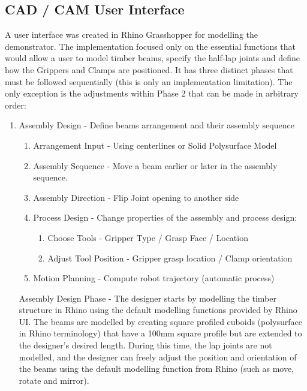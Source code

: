 \begin{itemize}
\subsection{CAD / CAM User Interface}
A user interface was created in Rhino Grasshopper for modelling the demonstrator. The implementation focused only on the essential functions that would allow a user to model timber beams, specify the half-lap joints and define how the Grippers and Clamps are positioned. It has three distinct phases that must be followed sequentially (this is only an implementation limitation). The only exception is the adjustments within Phase 2 that can be made in arbitrary order:
\begin{enumerate}
\item Assembly Design - Define beams arrangement and their assembly sequence
\begin{enumerate}
    \item Arrangement Input - Using centerlines or Solid Polysurface Model
    \item Assembly Sequence - Move a beam earlier or later in the assembly sequence.
    \item Assembly Direction - Flip Joint opening to another side
\item Process Design - Change properties of the assembly and process design:
    \begin{enumerate}
    \item Choose Tools - Gripper Type / Grasp Face / Location
    \item Adjust Tool Position - Gripper grasp location / Clamp orientation
    \end{enumerate}
\item Motion Planning - Compute robot trajectory (automatic process)
\end{enumerate}

Assembly Design Phase - The designer starts by modelling the timber structure in Rhino using the default modelling functions provided by Rhino UI. The beams are modelled by creating square profiled cuboids (polysurface in Rhino terminology) that have a 100mm square profile but are extended to the designer’s desired length. During this time, the lap joints are not modelled, and the designer can freely adjust the position and orientation of the beams using the default modelling function from Rhino (such as move, rotate and mirror).


\end{enumerate}
\end{itemize}
